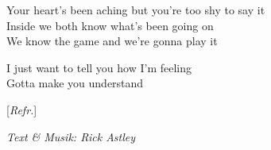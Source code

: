 Your heart's been aching but you're too shy to say it\\
Inside we both know what's been going on\\
We know the game and we're gonna play it\par
\vspace{10pt}
I just want to tell you how I'm feeling\\
Gotta make you understand\par
\vspace{10pt}
{\footnotesize[\textit{Refr.}]}\par%
\vspace{10pt}
{\footnotesize\textit{Text \& Musik: Rick Astley}}

